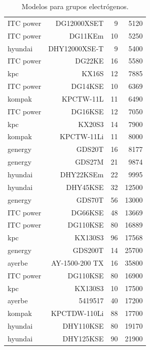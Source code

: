 \begin{table}[htbp]
\begin{tabular}{lrrr}
		ITC power     & DG12000XSET    & 9                    & 5120          \\
		ITC power     & DG11KEm        & 10                   & 5250          \\
		hyundai       & DHY12000XSE-T  & 9                    & 5400          \\
		ITC power     & DG22KE         & 16                   & 5580          \\
		kpc           & KX16S          & 12                   & 7885          \\
		ITC power     & DG14KSE        & 10                   & 6369          \\
		kompak        & KPCTW-11L      & 11                   & 6490          \\
		ITC power     & DG16KSE        & 12                   & 7050          \\
		kpc           & KX20S3         & 14                   & 7900          \\
		kompak        & KPCTW-11Li     & 11                   & 8000          \\
		genergy       & GDS20T         & 16                   & 8177          \\
		genergy       & GDS27M         & 21                   & 9874          \\
		hyundai       & DHY22KSEm      & 22                   & 9995          \\
		hyundai       & DHY45KSE       & 32                   & 12500         \\
		genergy       & GDS70T         & 56                   & 13000         \\
		ITC power     & DG66KSE        & 48                   & 13669         \\
		ITC power     & DG110KSE       & 80                   & 16889         \\
		kpc           & KX130S3        & 96                   & 17568         \\
		genergy       & GDS200T        & 14                   & 25700         \\
		ayerbe        & AY-1500-200 TX & 16                   & 35800         \\
		ITC power     & DG110KSE       & 80                   & 16900         \\
		kpc           & KX130S3        & 10                   & 17500         \\
		ayerbe        & 5419517        & 40                   & 17200         \\
		kompak        & KPCTDW-110Li   & 88                   & 17700         \\
		hyundai       & DHY110KSE      & 80                   & 19170         \\
		hyundai       & DHY125KSE      & 90                   & 21900         \\
		\bottomrule
	\end{tabular}
	\caption{Modelos para grupos electrógenos.}
	\label{tab:generator_data}
\end{table}


